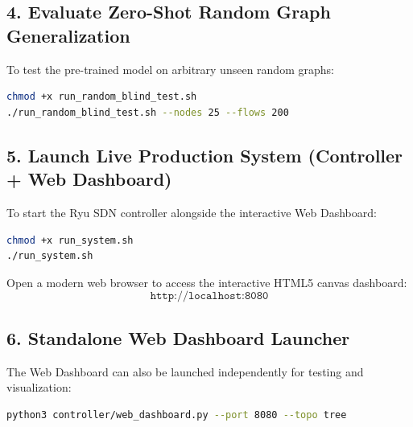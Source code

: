 \documentclass[12pt,a4paper,oneside]{report}
\begin{document}
\subsection{4. Evaluate Zero-Shot Random Graph Generalization}
To test the pre-trained model on arbitrary unseen random graphs:
\begin{lstlisting}[language=bash]
chmod +x run_random_blind_test.sh
./run_random_blind_test.sh --nodes 25 --flows 200
\end{lstlisting}

\subsection{5. Launch Live Production System (Controller + Web Dashboard)}
To start the Ryu SDN controller alongside the interactive Web Dashboard:
\begin{lstlisting}[language=bash]
chmod +x run_system.sh
./run_system.sh
\end{lstlisting}
Open a modern web browser to access the interactive HTML5 canvas dashboard:
\begin{equation*}
    \texttt{http://localhost:8080}
\end{equation*}

\subsection{6. Standalone Web Dashboard Launcher}
The Web Dashboard can also be launched independently for testing and visualization:
\begin{lstlisting}[language=bash]
python3 controller/web_dashboard.py --port 8080 --topo tree
\end{lstlisting}
\end{document}
